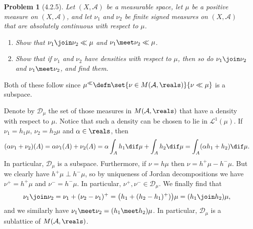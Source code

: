 \documentclass[a4paper, 11pt]{memoir}
\theoremstyle{plaincustomnumber}
\newtheorem{problem}{Problem}
\theoremstyle{changedotbreakcustomnumber}
\newcommand{\calL}{\mathcal{L}}
\newcommand{\calA}{\mathcal{A}}
\newcommand{\calD}{\mathcal{D}}
\begin{document}
\begin{problem}[4.2.5]
    Let $(X,\calA)$ be a measurable space, let $\mu$ be a positive measure on $(X,\calA)$, and let $\nu_1$ and $\nu_2$ be finite signed measures on $(X,\calA)$ that are absolutely continuous with respect to $\mu$.
    \begin{enumerate}
        \item Show that $\nu_1 \join \nu_2 \ll \mu$ and $\nu_1 \meet \nu_2 \ll \mu$.
        
        \item Show that if $\nu_1$ and $\nu_2$ have densities with respect to $\mu$, then so do $\nu_1 \join \nu_2$ and $\nu_1 \meet \nu_2$, and find them.
    \end{enumerate}
\end{problem}

\begin{solution}
\begin{solutionsec}
    \item Both of these follow since $\mu^\ll \defn \set{\nu \in M(\calA,\reals)}{\nu \ll \mu}$ is a subspace.

    \item Denote by $\calD_\mu$ the set of those measures in $M(\calA,\reals)$ that have a density with respect to $\mu$. Notice that such a density can be chosen to lie in $\calL^1(\mu)$. If $\nu_1 = h_1 \mu$, $\nu_2 = h_2 \mu$ and $\alpha \in \reals$, then
    \begin{equation*}
        (\alpha \nu_1 + \nu_2)(A)
            = \alpha \nu_1(A) + \nu_2(A)
            = \alpha \int_A h_1 \dif\mu + \int_A h_2 \dif\mu
            = \int_A (\alpha h_1 + h_2) \dif\mu.
    \end{equation*}
    In particular, $\calD_\mu$ is a subspace. Furthermore, if $\nu = h \mu$ then $\nu = h^+ \mu - h^- \mu$. But we clearly have $h^+ \mu \perp h^- \mu$, so by uniqueness of Jordan decompositions we have $\nu^+ = h^+ \mu$ and $\nu^- = h^- \mu$. In particular, $\nu^+, \nu^- \in \calD_\mu$. We finally find that
    \begin{equation*}
        \nu_1 \join \nu_2
            = \nu_1 + (\nu_2 - \nu_1)^+
            = \bigl( h_1 + (h_2 - h_1)^+) \bigr) \mu
            = (h_1 \join h_2) \mu,
    \end{equation*}
    and we similarly have $\nu_1 \meet \nu_2 = (h_1 \meet h_2) \mu$. In particular, $\calD_\mu$ is a sublattice of $M(\calA,\reals)$.
\end{solutionsec}
\end{solution}
\end{document}
